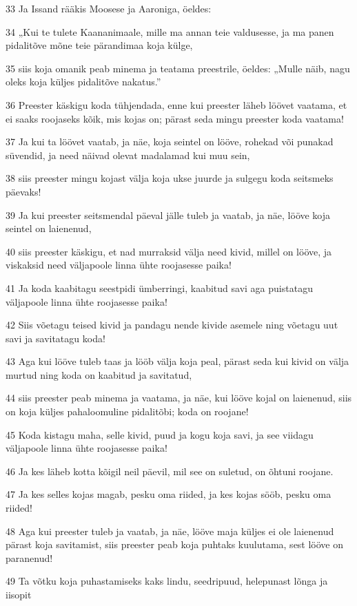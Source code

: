 \par 33 Ja Issand rääkis Moosese ja Aaroniga, öeldes:
\par 34 „Kui te tulete Kaananimaale, mille ma annan teie valdusesse, ja ma panen pidalitõve mõne teie pärandimaa koja külge,
\par 35 siis koja omanik peab minema ja teatama preestrile, öeldes: „Mulle näib, nagu oleks koja küljes pidalitõve nakatus.”
\par 36 Preester käskigu koda tühjendada, enne kui preester läheb löövet vaatama, et ei saaks roojaseks kõik, mis kojas on; pärast seda mingu preester koda vaatama!
\par 37 Ja kui ta löövet vaatab, ja näe, koja seintel on lööve, rohekad või punakad süvendid, ja need näivad olevat madalamad kui muu sein,
\par 38 siis preester mingu kojast välja koja ukse juurde ja sulgegu koda seitsmeks päevaks!
\par 39 Ja kui preester seitsmendal päeval jälle tuleb ja vaatab, ja näe, lööve koja seintel on laienenud,
\par 40 siis preester käskigu, et nad murraksid välja need kivid, millel on lööve, ja viskaksid need väljapoole linna ühte roojasesse paika!
\par 41 Ja koda kaabitagu seestpidi ümberringi, kaabitud savi aga puistatagu väljapoole linna ühte roojasesse paika!
\par 42 Siis võetagu teised kivid ja pandagu nende kivide asemele ning võetagu uut savi ja savitatagu koda!
\par 43 Aga kui lööve tuleb taas ja lööb välja koja peal, pärast seda kui kivid on välja murtud ning koda on kaabitud ja savitatud,
\par 44 siis preester peab minema ja vaatama, ja näe, kui lööve kojal on laienenud, siis on koja küljes pahaloomuline pidalitõbi; koda on roojane!
\par 45 Koda kistagu maha, selle kivid, puud ja kogu koja savi, ja see viidagu väljapoole linna ühte roojasesse paika!
\par 46 Ja kes läheb kotta kõigil neil päevil, mil see on suletud, on õhtuni roojane.
\par 47 Ja kes selles kojas magab, pesku oma riided, ja kes kojas sööb, pesku oma riided!
\par 48 Aga kui preester tuleb ja vaatab, ja näe, lööve maja küljes ei ole laienenud pärast koja savitamist, siis preester peab koja puhtaks kuulutama, sest lööve on paranenud!
\par 49 Ta võtku koja puhastamiseks kaks lindu, seedripuud, helepunast lõnga ja iisopit
